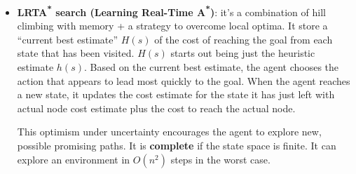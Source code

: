 \documentclass[12pt]{article}
\begin{document}
\begin{enumerate}[label=\textbf{OS.\arabic*}]
\begin{itemize}
        \item \textbf{LRTA\textsuperscript{*} search (Learning Real-Time A\textsuperscript{*})}: 
        it's a combination of hill climbing with memory + a strategy to overcome local optima.
        It store a ``current best estimate'' $H(s)$ of the cost of reaching the goal from each state that has been visited.
        $H(s)$ starts out being just the heuristic estimate $h(s)$.
        Based on the current best estimate, the agent chooses the action that appears to lead most quickly to the goal.
        When the agent reaches a new state, it updates the cost estimate for the state it has just left with actual node cost estimate plus the cost to reach the actual node.

        This optimism under uncertainty encourages the agent to explore new, possible promising paths.
        It is \textbf{complete} if the state space is finite.
        It can explore an environment in $O(n^2)$ steps in the worst case.

    \end{itemize}

\end{enumerate}
\end{document}
